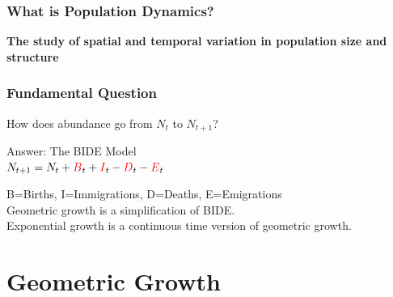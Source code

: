 \documentclass[color=usenames,dvipsnames]{beamer}\usepackage[]{graphicx}\usepackage[]{color}
\begin{document}




\begin{frame}
  \frametitle{What is Population Dynamics?}
  {\centering \Large \bf The study of spatial and temporal variation in
    population size and structure \\ }
\end{frame}






\begin{frame}%
  \frametitle{Fundamental Question}
  \begin{center}
   { \Large How does abundance go from $N_t$ to $N_{t+1}$?} \par
   \vspace{1.5cm}
   \large
   \pause
   Answer: The {\color{red} BIDE} Model  \\
     $N_{t+1} = N_t + {\color{red}B}_t + {\color{red}I}_t - {\color{red}D}_t - {\color{red}E}_t$
  \vspace{2mm}
  \end{center}
  B=Births, I=Immigrations, D=Deaths, E=Emigrations \\
  \pause
  \vfill
  Geometric growth is a simplification of BIDE. \\
  \pause
  \vfill
  Exponential growth is a continuous time version of geometric growth.
\end{frame}



\section{Geometric Growth}



\end{document}
